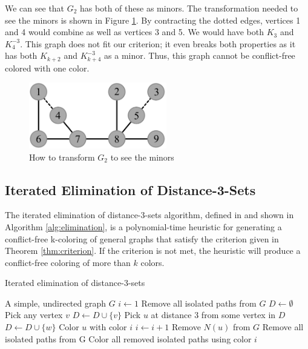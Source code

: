 \documentclass{sig-alternate}
\begin{document}
We can see that $G_2$ has both of these as minors. The transformation needed to see the minors is shown in Figure \ref{fig:criterion-minor}. By contracting the dotted edges, vertices 1 and 4 would combine as well as vertices 3 and 5. We would have both $K_{3}$ and $K_{4}^{-3}$. This graph does not fit our criterion; it even breaks both properties as it has both $K_{k+2}$ and $K_{k+4}^{-3}$ as a minor. Thus, this graph cannot be conflict-free colored with one color.


\begin{figure}[h]
	\centering
	\includegraphics[width=6cm]{../figures/criterion-minor.pdf}
	\caption{How to transform $G_2$ to see the minors}\label{fig:criterion-minor}
\end{figure}

\vspace{-0.1cm}

\subsection{Iterated Elimination of Distance-3-Sets}
\label{sec:iterated}
The iterated elimination of distance-3-sets algorithm, defined in \cite{abel2017three} and shown in Algorithm \ref{alg:elimination}, is a polynomial-time heuristic for generating a conflict-free k-coloring of general graphs that satisfy the criterion given in Theorem \ref{thm:criterion}. If the criterion is not met, the heuristic will produce a conflict-free coloring of more than $k$ colors.

\begin{algorithm}
\caption{Iterated elimination of distance-3-sets} \label{alg:elimination}
\begin{algorithmic}[1]
\Input A simple, undirected graph $G$
\State $i \gets 1$
\State Remove all isolated paths from $G$
	\State $D \gets \emptyset$
		\State Pick any vertex $v$
		\State $D \gets D \cup \{ v \}$
			\State Pick $u$ at distance 3 from some vertex in $D$
			\State $D \gets D \cup \{ w \}$
		\EndWhile
			\State Color $u$ with color $i$
		\EndFor
		\State $i \gets i + 1$
			\State Remove $N(u)$ from $G$
		\EndFor
		\State Remove all isolated paths from G
	\EndFor
\EndWhile
\State Color all removed isolated paths using color $i$
\end{algorithmic}
\end{algorithm}
\end{document}
